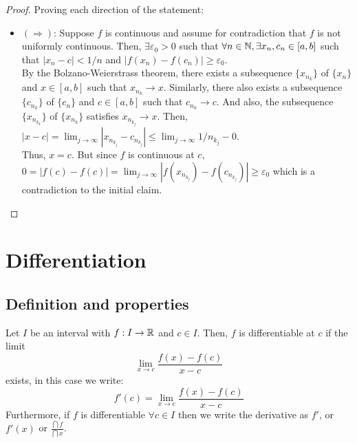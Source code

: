\begin{proof}
    Proving each direction of the statement:
    \begin{itemize}
        \item $(\Longrightarrow)$: Suppose $f$ is continuous and assume for contradiction that $f$ is not uniformly continuous. Then, $\exists \varepsilon_0 > 0$ such that $\forall n \in \mathbb{N}, \exists x_n, c_n \in [a,b]$ such that $|x_n-c|<1/n$ and $|f(x_n) - f(c_n)| \geq \varepsilon_0$. \\
        By the Bolzano-Weierstrass theorem, there exists a subsequence $\{x_{n_k}\}$ of $\{x_n\}$ and $x \in [a,b]$ such that $x_{n_k} \to x$. Similarly, there also exists a subsequence $\{c_{n_k}\}$ of $\{c_n\}$ and $c \in [a,b]$ such that $c_{n_k} \to c$. And also, the subsequence $\{x_{n_{k_k}}\}$ of $\{x_{n_k}\}$ satisfies $x_{n_{k_j}} \to x$. Then, $|x-c| = \lim_{j \to \infty} |x_{n_{k_j}} - c_{n_{k_j}}| \leq \lim_{j \to \infty} 1/n_{k_j} - 0$. \\
        Thus, $x = c$. But since $f$ is continuous at $c$, $0 = |f(c) - f(c)| = \lim_{j \to \infty} |f(x_{n_{k_j}}) - f(c_{n_{k_j}})| \geq \varepsilon_0$ which is a contradiction to the initial claim.
    \end{itemize}
\end{proof}

\section{Differentiation}

\subsection{Definition and properties}

\begin{definition}[Derivative]
    Let $I$ be an interval with $f: I \to \mathbb{R}$ and $c \in I$. Then, $f$ is differentiable at $c$ if the limit
    \begin{equation}
        \lim \limits_{x \to c} \frac{f(x) - f(c)}{x-c}
    \end{equation}
    exists, in this case we write:
    \begin{equation}
        f'(c) = \lim \limits_{x \to c} \frac{f(x) - f(c)}{x-c}
    \end{equation}
    Furthermore, if $f$ is differentiable $\forall c \in I$ then we write the derivative as $f'$, or $f'(x)$ or $\frac{\dint f}{\dint x}$.
\end{definition}

